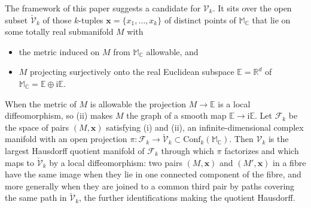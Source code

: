 \begin{definition}
  \label{def:vacuum-domain}
  \leanok
  The framework of this paper suggests a candidate for $\mathcal V_k$. It sits over the
  open subset $\check{\mathcal V}_k$ of those $k$-tuples
  $\mathbf x = \{x_1, \ldots, x_k\}$ of distinct points of $\mathbb M_{\mathbb C}$ that
  lie on some totally real submanifold $M$ with
  \begin{itemize}
    \item[(i)] the metric induced on $M$ from $\mathbb M_{\mathbb C}$ allowable, and
    \item[(ii)] $M$ projecting surjectively onto the real Euclidean subspace
      $\mathbb E = \mathbb R^d$ of
      $\mathbb M_{\mathbb C} = \mathbb E \oplus \mathrm i \mathbb E$.
  \end{itemize}
  When the metric of $M$ is allowable the projection $M \to \mathbb E$ is a local
  diffeomorphism, so (ii) makes $M$ the graph of a smooth map
  $\mathbb E \to \mathrm i \mathbb E$. Let $\mathcal F_k$ be the space of pairs
  $(M, \mathbf x)$ satisfying (i) and (ii), an infinite-dimensional complex manifold
  with an open projection
  $\pi \colon \mathcal F_k \to \check{\mathcal V}_k \subset
  \mathrm{Conf}_k(\mathbb M_{\mathbb C})$. Then $\mathcal V_k$ is the largest Hausdorff
  quotient manifold of $\mathcal F_k$ through which $\pi$ factorizes and which maps to
  $\check{\mathcal V}_k$ by a local diffeomorphism: two pairs $(M, \mathbf x)$ and
  $(M', \mathbf x)$ in a fibre have the same image when they lie in one connected
  component of the fibre, and more generally when they are joined to a common third
  pair by paths covering the same path in $\check{\mathcal V}_k$, the further
  identifications making the quotient Hausdorff.


\end{definition}
